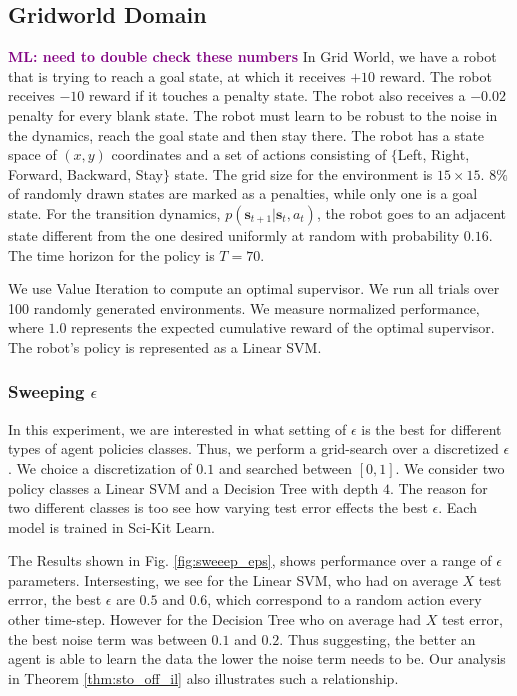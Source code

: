 \documentclass[conference]{article}
\newcommand{\bs}{\mathbf{s}}
\newcommand{\mlnote}[1]{\ifthenelse{ \boolean{include-notes}}%
 {\textcolor{purple}{\textbf{ML: #1}}}{}}
\begin{document}
\subsection{Gridworld Domain}
\mlnote{need to double check these numbers}
In Grid World, we have a robot that is trying to reach a goal state, at which it receives $+10$ reward. The robot receives $-10$ reward if it touches a penalty state. The robot also receives a $-0.02$ penalty for every blank state. The robot must learn to be robust to the noise in the dynamics, reach the goal state and then stay there.
The robot has a state space of $(x,y)$ coordinates and a set of actions consisting of $\lbrace$Left, Right, Forward, Backward, Stay$\rbrace$ state. The grid size for the environment is $15 \times 15$. $8\%$ of randomly drawn states are marked as a penalties, while only one is a goal state. For the transition dynamics, $p(\bs_{t+1}|\bs_{t},a_t)$, the robot goes to an adjacent state different from the one desired uniformly at random with probability $0.16$. The time horizon for the policy is $T=70$. 

We use Value Iteration to compute an optimal supervisor. We run all trials over 100 randomly generated environments. We measure normalized performance, where $1.0$ represents the expected cumulative reward of the optimal supervisor. The robot's policy is represented as a Linear SVM. 

\subsubsection{Sweeping $\epsilon$}
In this experiment, we are interested in what setting of $\epsilon$ is the best for different types of agent policies classes. Thus, we perform a grid-search over a discretized $\epsilon$. We choice a discretization  of $0.1$ and searched between $[0,1]$. We consider two policy classes a Linear SVM and a Decision Tree with depth $4$. The reason for two different classes is too see how varying test error effects the best $\epsilon$. Each model is trained in Sci-Kit Learn. 

The Results shown in Fig. \ref{fig:sweeep_eps}, shows performance over a range of $\epsilon$ parameters. Intersesting, we see for the Linear SVM, who had on average $X$ test errror, the best $\epsilon$ are $0.5$ and $0.6$, which correspond to a random action every other time-step. However for the Decision Tree who on average had $X$ test error, the best noise term was between $0.1$ and $0.2$. Thus suggesting, the better an agent is able to learn the data the lower the noise term needs to be. Our analysis in Theorem \ref{thm:sto_off_il} also illustrates such a relationship. 
\end{document}
